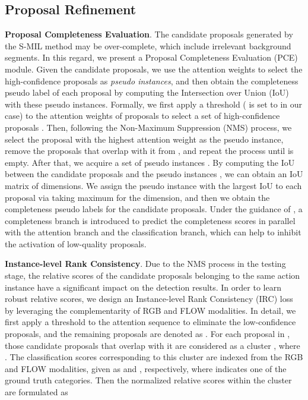 \subsection{Proposal Refinement}
\label{sec:instance-level}
{\bf Proposal Completeness Evaluation}.
The candidate proposals generated by the S-MIL method may be over-complete, 
which include irrelevant background segments.
In this regard, we present a Proposal Completeness Evaluation (PCE) module.
Given the candidate proposals, we use the attention weights to select the high-confidence proposals as \emph{pseudo instances},
and then obtain the completeness pseudo label of each proposal by computing the Intersection over Union (IoU) with these pseudo instances.
Formally, we first apply a threshold  ( is set to  in our case) to the attention weights  of proposals to select a set of high-confidence proposals .
Then, following the Non-Maximum Suppression (NMS) process,
we select the proposal with the highest attention weight as the pseudo instance,
remove the proposals that overlap with it from , and repeat the process until  is empty.
After that, we acquire a set of pseudo instances .
By computing the IoU between the candidate proposals  and the pseudo instances ,
we can obtain an IoU matrix of  dimensions.
We assign the pseudo instance with the largest IoU to each proposal via taking maximum for the  dimension,
and then we obtain the completeness pseudo labels  for the candidate proposals.
Under the guidance of ,
a completeness branch is introduced to predict the completeness scores  in parallel with the attention branch and the classification branch,
which can help to inhibit the activation of low-quality proposals.


{\bf Instance-level Rank Consistency}.
Due to the NMS process in the testing stage,
the relative scores of the candidate proposals belonging to the same action instance have a significant impact on the detection results.
In order to learn robust relative scores,
we design an Instance-level Rank Consistency (IRC) loss by leveraging the complementarity of RGB and FLOW modalities.
In detail, 
we first apply a threshold  to the attention sequence  to eliminate the low-confidence proposals,
and the remaining proposals are denoted as .
For each proposal  in ,
those candidate proposals that overlap with it are considered as a cluster , where .
The classification scores  corresponding to this cluster are indexed from the RGB and FLOW modalities,
given as  and , respectively, where  indicates one of the ground truth categories.
Then the normalized relative scores within the cluster are formulated as

